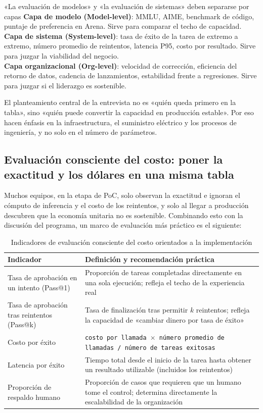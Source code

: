 \begin{knowledgebox}{«La evaluación de modelos» y «la evaluación de sistemas» deben separarse por capas}
\textbf{Capa de modelo (Model-level)}: MMLU, AIME, benchmark de código, puntaje de preferencia en Arena. Sirve para comparar el techo de capacidad.\\
\textbf{Capa de sistema (System-level)}: tasa de éxito de la tarea de extremo a extremo, número promedio de reintentos, latencia P95, costo por resultado. Sirve para juzgar la viabilidad del negocio.\\
\textbf{Capa organizacional (Org-level)}: velocidad de corrección, eficiencia del retorno de datos, cadencia de lanzamientos, estabilidad frente a regresiones. Sirve para juzgar si el liderazgo es sostenible.

El planteamiento central de la entrevista no es «quién queda primero en la tabla», sino «quién puede convertir la capacidad en producción estable». Por eso hacen énfasis en la infraestructura, el suministro eléctrico y los procesos de ingeniería, y no solo en el número de parámetros.
\end{knowledgebox}

\subsection{Evaluación consciente del costo: poner la exactitud y los dólares en una misma tabla}

Muchos equipos, en la etapa de PoC, solo observan la exactitud e ignoran el cómputo de inferencia y el costo de los reintentos, y solo al llegar a producción descubren que la economía unitaria no es sostenible. Combinando esto con la discusión del programa, un marco de evaluación más práctico es el siguiente:

\begin{table}[H]
\centering
\begin{tabular}{lp{9cm}}
\toprule
\textbf{Indicador} & \textbf{Definición y recomendación práctica} \\
\midrule
Tasa de aprobación en un intento (Pass@1) & Proporción de tareas completadas directamente en una sola ejecución; refleja el techo de la experiencia real \\
Tasa de aprobación tras reintentos (Pass@k) & Tasa de finalización tras permitir $k$ reintentos; refleja la capacidad de «cambiar dinero por tasa de éxito» \\
Costo por éxito & \texttt{costo por llamada $\times$ número promedio de llamadas / número de tareas exitosas} \\
Latencia por éxito & Tiempo total desde el inicio de la tarea hasta obtener un resultado utilizable (incluidos los reintentos) \\
Proporción de respaldo humano & Proporción de casos que requieren que un humano tome el control; determina directamente la escalabilidad de la organización \\
\bottomrule
\end{tabular}
\caption{Indicadores de evaluación consciente del costo orientados a la implementación}
\end{table}

